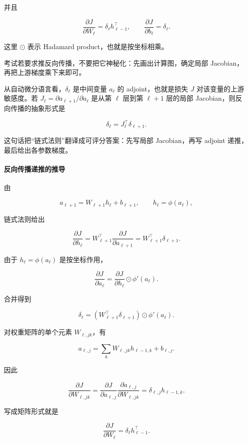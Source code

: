 并且

\[
  \frac{\partial J}{\partial W_\ell}
  =
  \delta_\ell h_{\ell-1}^\top,
  \qquad
  \frac{\partial J}{\partial b_\ell}
  =
  \delta_\ell.
\]

这里 \(\odot\) 表示 Hadamard product，也就是按坐标相乘。

考试若要求推反向传播，不要把它神秘化：先画出计算图，确定局部 Jacobian，再把上游梯度乘下来即可。

从自动微分语言看，\(\delta_\ell\) 是中间变量 \(a_\ell\) 的 adjoint，也就是损失 \(J\) 对该变量的上游敏感度。若 \(J_\ell=\partial a_{\ell+1}/\partial a_\ell\) 是从第 \(\ell\) 层到第 \(\ell+1\) 层的局部 Jacobian，则反向传播的抽象形式是

\[
  \delta_\ell
  =
  J_\ell^\top \delta_{\ell+1}.
\]

这句话把“链式法则”翻译成可评分答案：先写局部 Jacobian，再写 adjoint 递推，最后给出各参数梯度。

\paragraph{反向传播递推的推导}

由

\[
  a_{\ell+1}=W_{\ell+1}h_\ell+b_{\ell+1},
  \qquad
  h_\ell=\phi(a_\ell),
\]

链式法则给出

\[
  \frac{\partial J}{\partial h_\ell}
  =
  W_{\ell+1}^\top
  \frac{\partial J}{\partial a_{\ell+1}}
  =
  W_{\ell+1}^\top\delta_{\ell+1}.
\]

由于 \(h_\ell=\phi(a_\ell)\) 是按坐标作用，

\[
  \frac{\partial J}{\partial a_\ell}
  =
  \frac{\partial J}{\partial h_\ell}
  \odot
  \phi'(a_\ell).
\]

合并得到

\[
  \delta_\ell
  =
  (W_{\ell+1}^\top\delta_{\ell+1})
  \odot
  \phi'(a_\ell).
\]

对权重矩阵的单个元素 \(W_{\ell,jk}\)，有

\[
  a_{\ell,j}
  =
  \sum_k W_{\ell,jk}h_{\ell-1,k}+b_{\ell,j}.
\]

因此

\[
  \frac{\partial J}{\partial W_{\ell,jk}}
  =
  \frac{\partial J}{\partial a_{\ell,j}}
  \frac{\partial a_{\ell,j}}{\partial W_{\ell,jk}}
  =
  \delta_{\ell,j}h_{\ell-1,k}.
\]

写成矩阵形式就是

\[
  \frac{\partial J}{\partial W_\ell}
  =
  \delta_\ell h_{\ell-1}^\top.
\]

